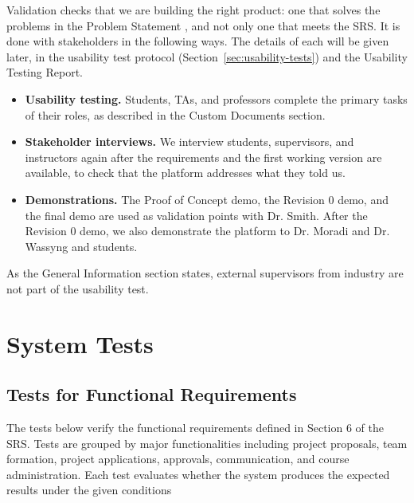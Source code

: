 \documentclass[12pt, titlepage]{article}
\begin{document}
  Validation checks that we are building the right product:
  one that solves the problems in the Problem Statement \citep{ProblemStatement},
  and not only one that meets the SRS. It is done with stakeholders in the following ways.
  The details of each will be given later, in the usability test protocol (Section~\ref{sec:usability-tests})
  and the Usability Testing Report.

  \begin{itemize}
    \item \textbf{Usability testing.} Students, TAs, and professors complete the primary tasks of their
    roles, as described in the Custom Documents section.
    \item \textbf{Stakeholder interviews.} We interview students, supervisors, and instructors again after
    the requirements and the first working version are available, to check that the platform addresses what they told us.
    \item \textbf{Demonstrations.} The Proof of Concept demo, the Revision 0 demo, and the final demo are used as
    validation points with Dr. Smith. After the Revision 0 demo, we also demonstrate the platform to
    Dr. Moradi and Dr. Wassyng and students.
  \end{itemize}

  As the General Information section states, external supervisors from industry are not part of the
  usability test.

  \section{System Tests}
  \label{sec:system-tests}


\subsection{Tests for Functional Requirements}


The tests below verify the functional requirements defined in Section 6 of the SRS. Tests are grouped by major functionalities including project proposals, team formation, project applications, approvals, communication, and course administration. Each test evaluates whether the system produces the expected results under the given conditions
\end{document}
